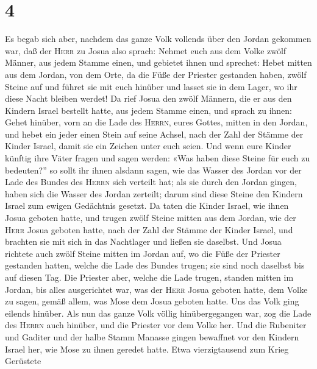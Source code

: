 \hypertarget{section-3}{%
\section{4}\label{section-3}}

 Es begab sich aber, nachdem das ganze Volk vollends über
den Jordan gekommen war, daß der \textsc{Herr} zu Josua also sprach:
 Nehmet euch aus dem Volke zwölf Männer, aus jedem Stamme
einen,  und gebietet ihnen und sprechet: Hebet mitten aus
dem Jordan, von dem Orte, da die Füße der Priester gestanden haben,
zwölf Steine auf und führet sie mit euch hinüber und lasset sie in dem
Lager, wo ihr diese Nacht bleiben werdet!  Da rief Josua
den zwölf Männern, die er aus den Kindern Israel bestellt hatte, aus
jedem Stamme einen, und sprach zu ihnen:  Gehet hinüber,
vorn an die Lade des \textsc{Herrn}, eures Gottes, mitten in den Jordan,
und hebet ein jeder einen Stein auf seine Achsel, nach der Zahl der
Stämme der Kinder Israel,  damit sie ein Zeichen unter
euch seien. Und wenn eure Kinder künftig ihre Väter fragen und sagen
werden: «Was haben diese Steine für euch zu bedeuten?'' 
so sollt ihr ihnen alsdann sagen, wie das Wasser des Jordan vor der Lade
des Bundes des \textsc{Herrn} sich verteilt hat; als sie durch den
Jordan gingen, haben sich die Wasser des Jordan zerteilt; darum sind
diese Steine den Kindern Israel zum ewigen Gedächtnis gesetzt.
 Da taten die Kinder Israel, wie ihnen Josua geboten
hatte, und trugen zwölf Steine mitten aus dem Jordan, wie der
\textsc{Herr} Josua geboten hatte, nach der Zahl der Stämme der Kinder
Israel, und brachten sie mit sich in das Nachtlager und ließen sie
daselbst.  Und Josua richtete auch zwölf Steine mitten im
Jordan auf, wo die Füße der Priester gestanden hatten, welche die Lade
des Bundes trugen; sie sind noch daselbst bis auf diesen Tag.
 Die Priester aber, welche die Lade trugen, standen
mitten im Jordan, bis alles ausgerichtet war, was der \textsc{Herr}
Josua geboten hatte, dem Volke zu sagen, gemäß allem, was Mose dem Josua
geboten hatte. Uns das Volk ging eilends hinüber.  Als
nun das ganze Volk völlig hinübergegangen war, zog die Lade des
\textsc{Herrn} auch hinüber, und die Priester vor dem Volke her.
 Und die Rubeniter und Gaditer und der halbe Stamm
Manasse gingen bewaffnet vor den Kindern Israel her, wie Mose zu ihnen
geredet hatte.  Etwa vierzigtausend zum Krieg Gerüstete
